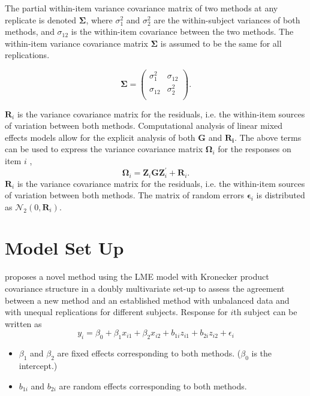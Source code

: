 \documentclass[12pt, a4paper]{report}
\theoremstyle{plain}
\theoremstyle{definition}
\theoremstyle{remark}
\begin{document}
\bigskip

The partial within-item variance covariance matrix of two methods at any replicate is denoted $\boldsymbol{\Sigma}$, where $\sigma^2_{1}$ and $\sigma^2_{2}$ are the within-subject variances of both methods, and $\sigma_{12}$ is the within-item covariance between the two methods. The within-item variance covariance matrix $\boldsymbol{\Sigma}$ is assumed to be the same for all replications.

\[
\boldsymbol{\Sigma} = \left( \begin{array}{cc}
\sigma^2_{1} & \sigma_{12} \\
\sigma_{12} & \sigma^2_{2} \\
\end{array}\right).
\]	



$\boldsymbol{R}_{i}$ is the variance covariance matrix for the residuals, i.e. the within-item sources of variation between both methods. Computational analysis of linear mixed effects models allow for the explicit analysis of both $\boldsymbol{G}$ and $\boldsymbol{R_i}$.
The above terms can be used to express the  variance covariance matrix $\boldsymbol{\Omega}_i$ for the responses on item $i$ ,
\[
\boldsymbol{\Omega}_i = \boldsymbol{Z}_i \boldsymbol{G} \boldsymbol{Z}_i^{\prime} + \boldsymbol{R}_i.
\]
$\boldsymbol{R}_{i}$ is the variance covariance matrix for the residuals, i.e. the within-item sources of variation between both methods.	
The matrix of random errors $\boldsymbol{\epsilon}_i$ is distributed as $\mathcal{N}_2(0,\boldsymbol{R}_i)$.


\section{Model Set Up}

\citet{ARoy2009} proposes a novel method using the LME model with Kronecker product covariance structure in a doubly multivariate set-up to assess the agreement between a new method and an established method with unbalanced data and with unequal replications for different subjects.
Response for $i$th subject can be written as
\[ y_i = \beta_0 + \beta_1x_{i1} + \beta_2x_{i2} + b_{1i}z_{i1}  + b_{2i}z_{i2} + \epsilon_i \]
\begin{itemize}
	\item $\beta_1$ and $\beta_2$ are fixed effects corresponding to both methods. ($\beta_0$ is the intercept.)
	\item $b_{1i}$ and $b_{2i}$ are random effects corresponding to both methods.
\end{itemize}
\end{document}

